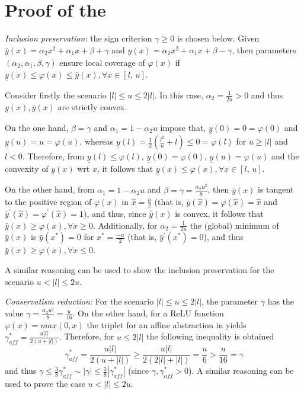 \documentclass[journal]{IEEEtran}
\begin{document}

\section{Proof of the } \label{app:appendix_b} 

\textit{Inclusion preservation:} the sign criterion $\gamma \geq 0$ is chosen below. Given $\bar{y}(x) = \alpha_2x^2+\alpha_1x+\beta+\gamma$ and $\underline{y}(x) = \alpha_2x^2+\alpha_1x+\beta-\gamma$, then parameters $(\alpha_2,\alpha_1,\beta,\gamma)$ ensure local coverage of $\varphi(x)$ if 
$\underline{y}(x) \leq \varphi(x) \leq \bar{y}(x), \forall x \in [l, \,u]$.

Consider firstly the scenario $|l| \leq u \leq 2|l|$. In this case, $\alpha_2 =  \frac{1}{2u} >0$ and thus $\underline{y}(x),\bar{y}(x)$ are strictly convex. 

On the one hand,  $\beta = \gamma$ and $\alpha_1 = 1-\alpha_2u$ impose that, $\underline{y}(0) = 0 = \varphi(0)$ and $\underline{y}(u) = u = \varphi(u)$, whereas  $\underline{y}(l) = \frac{1}{2}(\frac{l^2}{u}+l) \leq 0 = \varphi(l)$ for $u\geq |l|$ and $l<0$. Therefore, from $\underline{y}(l) \leq \varphi(l)$, $\underline{y}(0) = \varphi(0)$, $\underline{y}(u) = \varphi(u)$ and the convexity of $\underline{y}(x)$ wrt $x$, it follows that $\underline{y}(x) \leq \varphi(x) , \forall x \in [l, \, u]$.

On the other hand, from $\alpha_1 = 1-\alpha_2u$ and $\beta= \gamma = \frac{\alpha_2u^2}{8}$, then $\bar{y}(x)$ is tangent to the positive region of $\varphi(x)$ in $\hat{x} = \frac{u}{2}$ (that is, $\bar{y}(\hat{x}) = \varphi(\hat{x}) = \hat{x}$ and $\bar{y}^\prime(\hat{x}) = \varphi^\prime(\hat{x}) = 1$), and thus, since $\bar{y}(x)$ is convex, it follows that $\bar{y}(x) \geq \varphi(x), \forall x \geq 0$. Additionally,  for $\alpha_2 =  \frac{1}{2u}$ the (global) minimum of $\bar{y}(x)$ is  $\bar{y}(x^*) = 0$ for $x^* = \frac{-u}{2}$ (that is, $\bar{y}^\prime(x^*) = 0$), and thus $\bar{y}(x) \geq \varphi(x), \forall x \leq 0$.

A similar reasoning can be used to show the inclusion preservation for the scenario $u<|l|\leq 2u$.

\textit{Conservatism reduction:} For  the scenario $|l| \leq u \leq 2|l|$, the parameter $\gamma$ has the value $\gamma = \frac{\alpha_2u^2}{8} = \frac{u}{16}$. On the other hand, for a ReLU function $\varphi(x) = max(0,x)$ the triplet for an affine abstraction in  yields $\gamma_{aff}^* = \frac{u|l|}{2(u+|l|)}$. Therefore, for $u \leq 2|l|$ the following inequality is obtained
\begin{equation*}
    \gamma_{aff}^* = \frac{u|l|}{2(u+|l|)} \geq \frac{u|l|}{2(2|l|+|l|)} = \frac{u}{6} > \frac{u}{16} = \gamma
\end{equation*}
and thus $\gamma \leq \frac{3}{8}\gamma_{aff}^* \sim |\gamma| \leq \frac{3}{8}|\gamma_{aff}^*|$ (since $\gamma,\gamma_{aff}^*>0$). A similar reasoning can be used to prove the case $u<|l|\leq 2u$.
\end{document}
